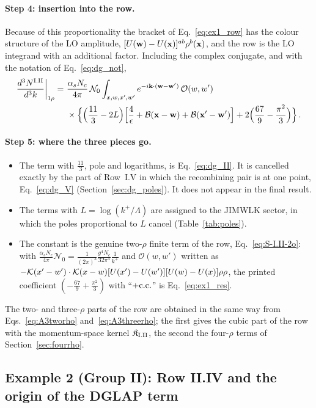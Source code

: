 \paragraph{Step 4: insertion into the row.} Because of this proportionality the bracket of Eq.~\eqref{eq:ex1_row} has the colour structure of the LO amplitude, $[U(\mathbf{w})-U(\mathbf{x})]^{ab}\rho^b(\mathbf{x})$, and the row is the LO integrand with an additional factor. Including the complex conjugate, and with the notation of Eq.~\eqref{eq:dg_not},
\begin{align}\label{eq:ex1_res}
\frac{d^3N^{\rm I.II}}{d^3k}\bigg|_{1\rho}=\ &\frac{\alpha_sN_c}{4\pi}\,\mathcal N_0\int_{x,w,x',w'}e^{-i\v k\cdot(\v w-\v w')}\,\mathcal O(w,w')\notag\\
&\times\Big\{\Big(\frac{11}{3}-2L\Big)\Big[\frac4\epsilon+\mathcal B(\v x-\v w)+\mathcal B(\v x'-\v w')\Big]+2\Big(\frac{67}{9}-\frac{\pi^2}{3}\Big)\Big\}\,.
\end{align}

\paragraph{Step 5: where the three pieces go.}
\begin{itemize}
\item The term with $\frac{11}{3}$, pole and logarithms, is Eq.~\eqref{eq:dg_II}. It is cancelled exactly by the part of Row~I.V in which the recombining pair is at one point, Eq.~\eqref{eq:dg_V} (Section~\ref{sec:dg_poles}). It does not appear in the final result.
\item The terms with $L=\log(k^+/\Lambda)$ are assigned to the JIMWLK sector, in which the poles proportional to $L$ cancel (Table~\ref{tab:poles}).
\item The constant is the genuine two-$\rho$ finite term of the row, Eq.~\eqref{eq:S-I.II-2o}: with $\frac{\alpha_sN_c}{4\pi}\mathcal N_0=\frac{1}{(2\pi)^3}\frac{g^4N_c}{32\pi^4}\frac{1}{k^+}$ and $\mathcal O(w,w')$ written as $-\mathcal{K}(x'-w')\cdot\mathcal{K}(x-w)[U(x')-U(w')][U(w)-U(x)]\rho\rho$, the printed coefficient $(-\frac{67}{9}+\frac{\pi^2}{3})$ with ``$+{\rm c.c.}$'' is Eq.~\eqref{eq:ex1_res}.
\end{itemize}
The two- and three-$\rho$ parts of the row are obtained in the same way from Eqs.~\eqref{eq:A3tworho} and~\eqref{eq:A3threerho}; the first gives the cubic part of the row with the momentum-space kernel $\mathfrak K_{\rm I.II}$, the second the four-$\rho$ terms of Section~\ref{sec:fourrho}.

\subsection{Example 2 (Group II): Row II.IV and the origin of the DGLAP term}\label{sec:ex_II_IV}

